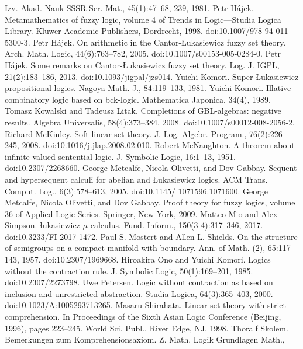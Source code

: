 Izv. Akad. Nauk SSSR Ser. Mat., 45(1):47–68, 239, 1981.
 Petr Hájek. Metamathematics of fuzzy logic, volume 4 of Trends in Logic—Studia Logica
Library. Kluwer Academic Publishers, Dordrecht, 1998. doi:10.1007/978-94-011-5300-3.
 Petr Hájek. On arithmetic in the Cantor-Łukasiewicz fuzzy set theory. Arch. Math. Logic,
44(6):763–782, 2005. doi:10.1007/s00153-005-0284-0.
 Petr Hájek. Some remarks on Cantor-Łukasiewicz fuzzy set theory. Log. J. IGPL, 21(2):183–186,
2013. doi:10.1093/jigpal/jzs014.
 Yuichi Komori. Super-Łukasiewicz propositional logics. Nagoya Math. J., 84:119–133, 1981.
 Yuichi Komori. Illative combinatory logic based on bck-logic. Mathematica Japonica, 34(4),
1989.
 Tomasz Kowalski and Tadeusz Litak. Completions of GBL-algebras: negative results. Algebra
Universalis, 58(4):373–384, 2008. doi:10.1007/s00012-008-2056-2.
 Richard McKinley. Soft linear set theory. J. Log. Algebr. Program., 76(2):226–245, 2008.
doi:10.1016/j.jlap.2008.02.010.
 Robert McNaughton. A theorem about infinite-valued sentential logic. J. Symbolic Logic,
16:1–13, 1951. doi:10.2307/2268660.
 George Metcalfe, Nicola Olivetti, and Dov Gabbay. Sequent and hypersequent calculi for
abelian and Łukasiewicz logics. ACM Trans. Comput. Log., 6(3):578–613, 2005. doi:10.1145/
1071596.1071600.
 George Metcalfe, Nicola Olivetti, and Dov Gabbay. Proof theory for fuzzy logics, volume 36 of
Applied Logic Series. Springer, New York, 2009.
 Matteo Mio and Alex Simpson. łukasiewicz \ensuremath{\mu}-calculus. Fund. Inform., 150(3-4):317–346, 2017.
doi:10.3233/FI-2017-1472.
 Paul S. Mostert and Allen L. Shields. On the structure of semigroups on a compact manifold
with boundary. Ann. of Math. (2), 65:117–143, 1957. doi:10.2307/1969668.
 Hiroakira Ono and Yuichi Komori. Logics without the contraction rule. J. Symbolic Logic,
50(1):169–201, 1985. doi:10.2307/2273798.
 Uwe Petersen. Logic without contraction as based on inclusion and unrestricted abstraction.
Studia Logica, 64(3):365–403, 2000. doi:10.1023/A:1005293713265.
 Masaru Shirahata. Linear set theory with strict comprehension. In Proceedings of the Sixth
Asian Logic Conference (Beijing, 1996), pages 223–245. World Sci. Publ., River Edge, NJ,
1998.
 Thoralf Skolem. Bemerkungen zum Komprehensionsaxiom. Z. Math. Logik Grundlagen Math.,
